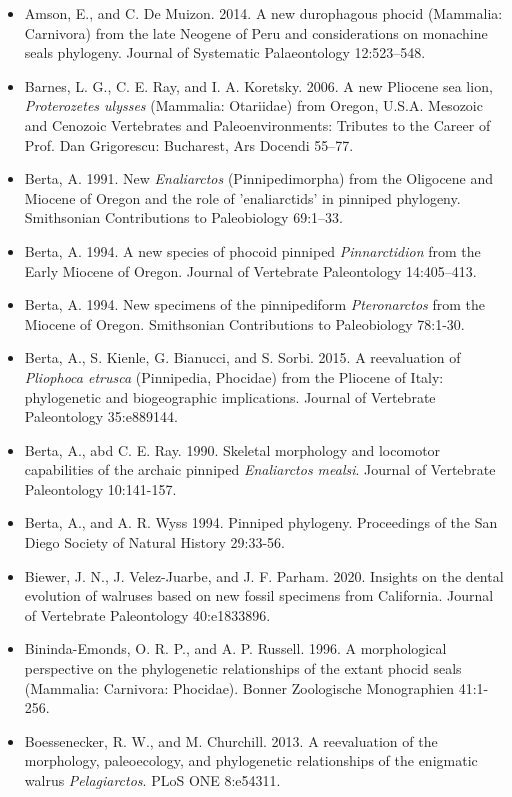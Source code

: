 \documentclass[a4paper, 12pt]{article}
\begin{document}
\begin{itemize}
\item Amson, E., and C. De Muizon. 2014. A new durophagous phocid (Mammalia: Carnivora) from the late Neogene of Peru and considerations on monachine seals phylogeny. Journal of Systematic Palaeontology 12:523–548.
\item Barnes, L. G., C. E. Ray, and I. A. Koretsky. 2006. A new Pliocene sea lion, \textit{Proterozetes ulysses} (Mammalia: Otariidae) from Oregon, U.S.A. Mesozoic and Cenozoic Vertebrates and Paleoenvironments: Tributes to the Career of Prof. Dan Grigorescu: Bucharest, Ars Docendi 55–77.
\item Berta, A. 1991. New \textit{Enaliarctos} (Pinnipedimorpha) from the Oligocene and Miocene of Oregon and the role of 'enaliarctids' in pinniped phylogeny. Smithsonian Contributions to Paleobiology 69:1–33.
\item Berta, A. 1994. A new species of phocoid pinniped \textit{Pinnarctidion} from the Early Miocene of Oregon. Journal of Vertebrate Paleontology 14:405–413.
\item Berta, A. 1994. New specimens of the pinnipediform \textit{Pteronarctos} from the Miocene of Oregon. Smithsonian Contributions to Paleobiology 78:1-30. 
\item Berta, A., S. Kienle, G. Bianucci, and S. Sorbi. 2015. A reevaluation of \textit{Pliophoca etrusca} (Pinnipedia, Phocidae) from the Pliocene of Italy: phylogenetic and biogeographic implications. Journal of Vertebrate Paleontology 35:e889144.
\item Berta, A., abd C. E. Ray. 1990. Skeletal morphology and locomotor capabilities of the archaic pinniped \textit{Enaliarctos mealsi}. Journal of Vertebrate Paleontology 10:141-157. 
\item Berta, A., and A. R. Wyss 1994. Pinniped phylogeny. Proceedings of the San Diego Society of Natural History 29:33-56.
\item Biewer, J. N., J. Velez-Juarbe, and J. F. Parham. 2020. Insights on the dental evolution of walruses based on new fossil specimens from California. Journal of Vertebrate Paleontology 40:e1833896.
\item Bininda-Emonds, O. R. P., and A. P. Russell. 1996. A morphological perspective on the phylogenetic relationships of the extant phocid seals (Mammalia: Carnivora: Phocidae). Bonner Zoologische Monographien 41:1-256. 
\item Boessenecker, R. W., and M. Churchill. 2013. A reevaluation of the morphology, paleoecology, and phylogenetic relationships of the enigmatic walrus \textit{Pelagiarctos}. PLoS ONE 8:e54311.

\end{itemize}
\end{document}
